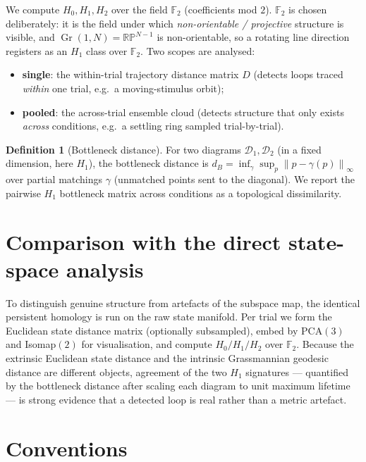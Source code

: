 \documentclass[11pt]{article}
\newcommand{\Gr}{\operatorname{Gr}}
\newcommand{\RP}{\mathbb{RP}}
\newcommand{\Fld}{\mathbb{F}}
\newcommand{\norm}[1]{\left\lVert #1 \right\rVert}
\theoremstyle{definition}
\newtheorem{definition}{Definition}
\begin{document}
We compute $H_0,H_1,H_2$ over the field $\Fld_2$ (coefficients mod $2$). $\Fld_2$ is
chosen deliberately: it is the field under which \emph{non-orientable / projective}
structure is visible, and $\Gr(1,N)=\RP^{N-1}$ is non-orientable, so a rotating line
direction registers as an $H_1$ class over $\Fld_2$. Two scopes are analysed:
\begin{itemize}[leftmargin=1.4em]
\item \textbf{single}: the within-trial trajectory distance matrix $D$ (detects
loops traced \emph{within} one trial, e.g.\ a moving-stimulus orbit);
\item \textbf{pooled}: the across-trial ensemble cloud (detects structure that only
exists \emph{across} conditions, e.g.\ a settling ring sampled trial-by-trial).
\end{itemize}

\begin{definition}[Bottleneck distance]
For two diagrams $\mathcal{D}_1,\mathcal{D}_2$ (in a fixed dimension, here $H_1$), the
bottleneck distance is
$d_B = \inf_{\gamma}\sup_{p} \norm{p-\gamma(p)}_\infty$ over partial matchings
$\gamma$ (unmatched points sent to the diagonal). We report the pairwise $H_1$
bottleneck matrix across conditions as a topological dissimilarity.
\end{definition}

\section{Comparison with the direct state-space analysis}
\label{sec:direct}

To distinguish genuine structure from artefacts of the subspace map, the identical
persistent homology is run on the raw state manifold. Per trial we form the Euclidean
state distance matrix (optionally subsampled), embed by PCA$(3)$ and Isomap$(2)$ for
visualisation, and compute $H_0/H_1/H_2$ over $\Fld_2$. Because the extrinsic
Euclidean state distance and the intrinsic Grassmannian geodesic distance are
different objects, agreement of the two $H_1$ signatures --- quantified by the
bottleneck distance after scaling each diagram to unit maximum lifetime --- is strong
evidence that a detected loop is real rather than a metric artefact.

\section{Conventions}
\label{sec:conv}
\end{document}
